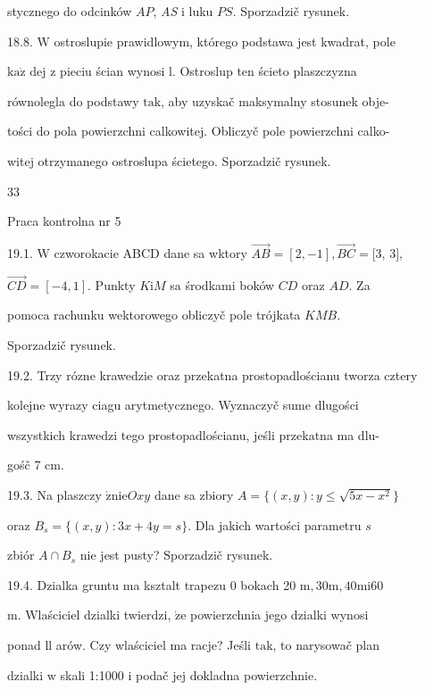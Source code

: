 \documentclass[a4paper,12pt]{article}
\begin{document}
stycznego do odcinków $AP$, {\it AS} $\mathrm{i}$ luku $PS$. Sporzadzič rysunek.

18.8. $\mathrm{W}$ ostroslupie prawidlowym, którego podstawa jest kwadrat, pole

$\mathrm{k}\mathrm{a}\dot{\mathrm{z}}$ dej $\mathrm{z}$ pieciu ścian wynosi l. Ostroslup ten ścieto plaszczyzna

równolegla do podstawy $\mathrm{t}\mathrm{a}\mathrm{k}$, aby uzyskač maksymalny stosunek obje-

tości do pola powierzchni calkowitej. Obliczyč pole powierzchni calko-

witej otrzymanego ostroslupa ścietego. Sporzadzič rysunek.





33

Praca kontrolna nr 5

19.1. $\mathrm{W}$ czworokacie ABCD dane sa wktory $\vec{AB}= [2,-1], \vec{BC}= [3$, 3$],$

$\vec{CD}=[-4,1]$. Punkty $K\mathrm{i}M$ sa środkami boków $CD$ oraz $AD$. Za

pomoca rachunku wektorowego obliczyč pole trójkata $KMB.$

Sporzadzič rysunek.

19.2. Trzy rózne krawedzie oraz przekatna prostopadlościanu tworza cztery

kolejne wyrazy ciagu arytmetycznego. Wyznaczyč sume dlugości

wszystkich krawedzi tego prostopadlościanu, jeśli przekatna ma dlu-

gośč 7 cm.

19.3. Na plaszczy $\acute{\mathrm{z}}\mathrm{n}\mathrm{i}\mathrm{e}Oxy$ dane sa zbiory $A = \{(x,y):y\leq\sqrt{5x-x^{2}}\}$

oraz $B_{s} = \{(x,y):3x+4y=s\}$. Dla jakich wartości parametru $s$

zbiór $A\cap B_{s}$ nie jest pusty? Sporzadzič rysunek.

19.4. Dzialka gruntu ma ksztalt trapezu $0$ bokach 20 $\mathrm{m}, 30\mathrm{m}, 40\mathrm{m}\mathrm{i}60$

$\mathrm{m}$. Wlaściciel dzialki twierdzi, $\dot{\mathrm{z}}\mathrm{e}$ powierzchnia jego dzialki wynosi

ponad ll arów. Czy wlaściciel ma racje? Jeśli $\mathrm{t}\mathrm{a}\mathrm{k}$, to narysowač plan

dzialki $\mathrm{w}$ skali 1:1000 $\mathrm{i}$ podač jej dokladna powierzchnie.
\end{document}
